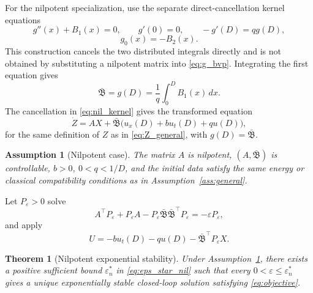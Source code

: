 \documentclass[journal]{IEEEtran}
\newtheorem{theorem}{Theorem}
\newtheorem{assumption}{Assumption}
\newcommand{\eps}{\varepsilon}
\newcommand{\Bbar}{\bar{\mathfrak B}}
\begin{document}
For the nilpotent specialization, use the separate direct-cancellation kernel equations
\begin{equation}
 g''(x)+B_1(x)=0,\qquad g'(0)=0,\qquad -g'(D)=qg(D),
\end{equation}
\begin{equation}
 g_0(x)=-B_2(x). \label{eq:nil_kernel}
\end{equation}
This construction cancels the two distributed integrals directly and is not obtained by substituting a nilpotent matrix into \eqref{eq:g_bvp}.
Integrating the first equation gives
\begin{equation}
 \Bbar=g(D)=\frac1q\int_0^D B_1(x)\,dx. \label{eq:Bbar}
\end{equation}
The cancellation in \eqref{eq:nil_kernel} gives the transformed equation
\begin{equation}
 \dot Z=AX+\Bbar\big(u_x(D)+bu_t(D)+qu(D)\big), \label{eq:nil_Z_target}
\end{equation}
for the same definition of \(Z\) as in \eqref{eq:Z_general}, with \(g(D)=\Bbar\).

\begin{assumption}[Nilpotent case]\label{ass:nil}
The matrix \(A\) is nilpotent, \((A,\Bbar)\) is controllable, \(b>0\), \(0<q<1/D\), and the initial data satisfy the same energy or classical compatibility conditions as in Assumption~\ref{ass:general}.
\end{assumption}

Let \(P_\eps>0\) solve
\begin{equation}
 A^\top P_\eps+P_\eps A-P_\eps\Bbar\Bbar^\top P_\eps=-\eps P_\eps, \label{eq:ARE_nil}
\end{equation}
and apply
\begin{equation}
 U=-bu_t(D)-qu(D)-\Bbar^\top P_\eps X. \label{eq:controller_nil}
\end{equation}

\begin{theorem}[Nilpotent exponential stability]\label{thm:nil}
Under Assumption~\ref{ass:nil}, there exists a positive sufficient bound \(\eps_n^*\) in \eqref{eq:eps_star_nil} such that every \(0<\eps\leq\eps_n^*\) gives a unique exponentially stable closed-loop solution satisfying \eqref{eq:objective}.
\end{theorem}
\end{document}
